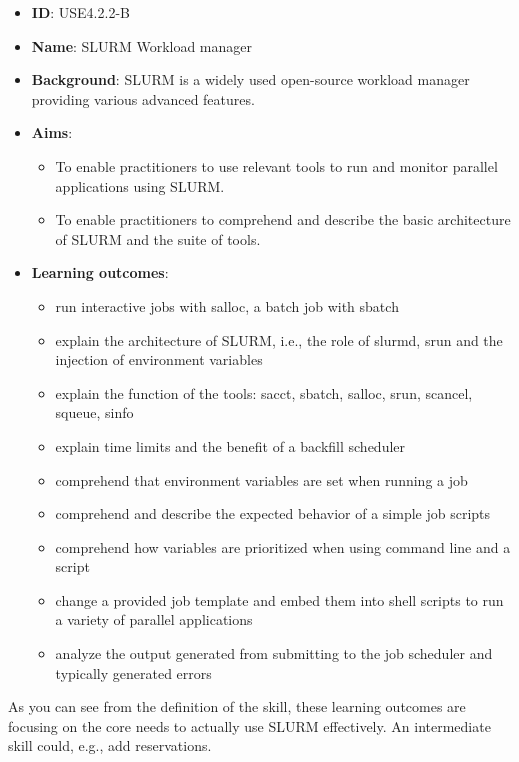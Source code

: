 \documentclass[jocse]{jocseart}
\begin{document}
\begin{itemize}
  \item \textbf{ID}: USE4.2.2-B
  \item \textbf{Name}: SLURM Workload manager
  \item \textbf{Background}: SLURM is a widely used open-source workload manager providing various advanced features.
  \item \textbf{Aims}:
  \begin{itemize}
    \item To enable practitioners to use relevant tools to run and monitor parallel applications using SLURM.
    \item To enable practitioners to comprehend and describe the basic architecture of SLURM and the suite of tools.
  \end{itemize}
  \item \textbf{Learning outcomes}:
  \begin{itemize}
  \item run interactive jobs with salloc, a batch job with sbatch
  \item explain the architecture of SLURM, i.e., the role of slurmd, srun and the injection of environment variables
  \item explain the function of the tools: sacct, sbatch, salloc, srun, scancel, squeue, sinfo
  \item explain time limits and the benefit of a backfill scheduler
  \item comprehend that environment variables are set when running a job
  \item comprehend and describe the expected behavior of a simple job scripts
  \item comprehend how variables are prioritized when using command line and a script
  \item change a provided job template and embed them into shell scripts to run a variety of parallel applications
  \item analyze the output generated from submitting to the job scheduler and typically generated errors
  \end{itemize}
\end{itemize}

As you can see from the definition of the skill, these learning outcomes are focusing on the core needs to actually use SLURM effectively.
An intermediate skill could, e.g., add reservations.

\end{document}
